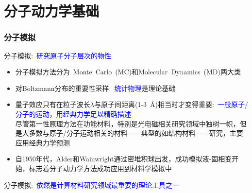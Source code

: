 \small
\section{分子动力学基础}
\frame
{
	\frametitle{分子模拟}
	分子模拟:~\textcolor{blue}{研究原子分子层次的物性}
	\begin{itemize}
		\item 分子模拟方法分为~\textrm{Monte~Carlo~(MC)}和\textrm{Molecular~Dynamics~(MD)}两大类
		\item 对\textrm{Boltzmann}分布的重要性采样:~\textcolor{blue}{统计物理}是理论基础
	\end{itemize}
	\begin{itemize}
		\item 量子效应只有在粒子波长$\lambda$与原子间距离\textrm{(1-3~\AA)}相当时才变得重要:~\textcolor{blue}{一般原子/分子的运动，用经典力学足以精确描述}\\
			尽管第一性原理方法在功能材料，特别是光电磁相关研究领域中独树一帜，但是大多数与原子/分子运动相关的材料——典型的如结构材料——研究，主要应用经典力学预测%
		\item 自\textrm{1950}年代，\textrm{Alder}和\textrm{Wainwright}通过密堆积球出发，成功模拟液-固相变开始，标志着分子动力学方法成功应用到材料学模拟中
	\end{itemize}
	分子模拟:~\textcolor{blue}{依然是计算材料研究领域最重要的理论工具之一}
}

